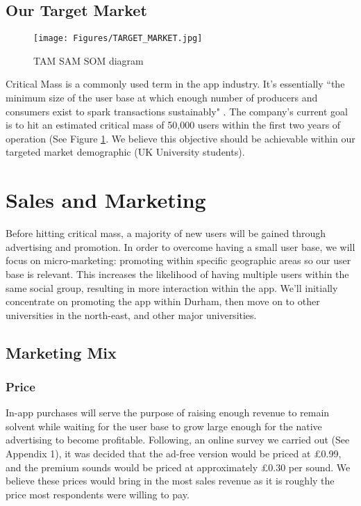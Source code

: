 \documentclass[12pt]{article}
\begin{document}
\subsection{Our Target Market}

\begin{figure}
    \centering
    \texttt{[image: Figures/TARGET\_MARKET.jpg]}
    \caption{TAM SAM SOM diagram}
    \label{fig:target market}
\end{figure}

Critical Mass is a commonly used term in the app industry. It’s essentially “the minimum size of the user base at which enough number of producers and consumers exist to spark transactions sustainably" \cite{Choudaryn.d.}. The company's current goal is to hit an estimated critical mass of 50,000 users within the first two years of operation (See Figure \ref{fig:target market}. We believe this objective should be achievable within our targeted market demographic (UK University students). 

\section{Sales and Marketing}
Before hitting critical mass, a majority of new users will be gained through advertising and promotion. In order to overcome having a small user base, we will focus on micro-marketing: promoting within specific geographic areas so our user base is relevant. This increases the likelihood of having multiple users within the same social group, resulting in more interaction within the app. We'll initially concentrate on promoting the app within Durham, then move on to other universities in the north-east, and other major universities.

\subsection{Marketing Mix}

\subsubsection*{Price}

In-app purchases will serve the purpose of raising enough revenue to remain solvent while waiting for the user base to grow large enough for the native advertising to become profitable. Following, an online survey we carried out (See Appendix 1), it was decided that the ad-free version would be priced at £0.99, and the premium sounds would be priced at approximately £0.30 per sound. We believe these prices would bring in the most sales revenue as it is roughly the price most respondents were willing to pay.
\end{document}
